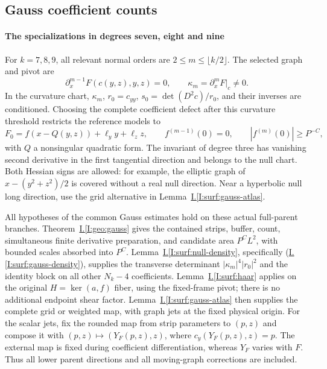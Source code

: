\documentclass[11pt]{amsart}
\theoremstyle{definition}
\theoremstyle{remark}
\numberwithin{equation}{section}
\newcommand{\partIref}[1]{\hyperref[I:#1]{I.\ref*{I:#1}}}
\newcommand{\partIeqref}[1]{\textup{(\partIref{#1})}}
\begin{document}
\subsection{Gauss coefficient counts}\label{surf:finite-gauss-counts}\label{low:78:s78gauss:section}\label{low:9:u9:gauss}

\paragraph{The specializations in degrees seven, eight and nine}

For $k=7,8,9$, all relevant normal orders are $2\le m\le\lfloor k/2\rfloor$. The selected graph and pivot are
\begin{equation}\label{low:78:s78gauss:normal-graph}
 \partial_x^{m-1}F(c(y,z),y,z)=0,\qquad \kappa_m=\partial_x^mF|_c\ne0.
\end{equation}
In the curvature chart, $\kappa_m$, $r_0=c_{yy}$, $s_0=\det(D^2c)/r_0$, and their inverses are conditioned. Choosing the complete coefficient defect after this curvature threshold restricts the reference models to
\[
F_0=f(x-Q(y,z))+\ell_y y+\ell_z z,\qquad f^{(m-1)}(0)=0,\qquad |f^{(m)}(0)|\ge P^{-C},
\]
with $Q$ a nonsingular quadratic form. The invariant of degree three has vanishing second derivative in the first tangential direction and belongs to the null chart. Both Hessian signs are allowed: for example, the elliptic graph of $x-(y^2+z^2)/2$ is covered without a real null direction. Near a hyperbolic null long direction, use the grid alternative in Lemma~\partIref{surf:gauss-atlas}.

All hypotheses of the common Gauss estimates hold on these actual full-parent branches. Theorem~\partIref{geo:gauss} gives the contained strips, buffer, count, simultaneous finite derivative preparation, and candidate area $P^CL^2$, with bounded scales absorbed into $P^C$. Lemma~\partIref{surf:null-density}, specifically \partIeqref{surf:gauss-density}, supplies the transverse determinant $|\kappa_m|^4|r_0|^2$ and the identity block on all other $N_k-4$ coefficients. Lemma~\partIref{surf:haar} applies on the original $H=\ker(a,f)$ fiber, using the fixed-frame pivot; there is no additional endpoint shear factor. Lemma~\partIref{surf:gauss-atlas} then supplies the complete grid or weighted map, with graph jets at the fixed physical origin. For the scalar jets, fix the rounded map from strip parameters to $(p,z)$ and compose it with $(p,z)\mapsto(Y_F(p,z),z)$, where $c_y(Y_F(p,z),z)=p$. The external map is fixed during coefficient differentiation, whereas $Y_F$ varies with $F$. Thus all lower parent directions and all moving-graph corrections are included.
\end{document}
